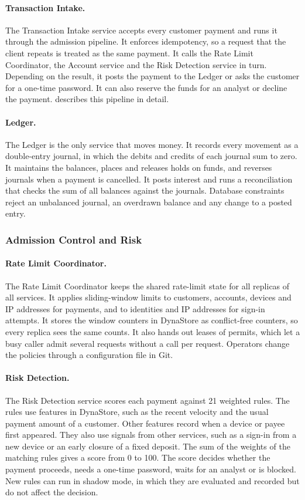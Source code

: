 \documentclass[11pt,a4paper]{article}
\begin{document}
\paragraph{Transaction Intake.} The Transaction Intake service accepts every customer payment and runs it through the admission pipeline. It enforces idempotency, so a request that the client repeats is treated as the same payment. It calls the Rate Limit Coordinator, the Account service and the Risk Detection service in turn. Depending on the result, it posts the payment to the Ledger or asks the customer for a one-time password. It can also reserve the funds for an analyst or decline the payment.  describes this pipeline in detail.

\paragraph{Ledger.} The Ledger is the only service that moves money. It records every movement as a double-entry journal, in which the debits and credits of each journal sum to zero. It maintains the balances, places and releases holds on funds, and reverses journals when a payment is cancelled. It posts interest and runs a reconciliation that checks the sum of all balances against the journals. Database constraints reject an unbalanced journal, an overdrawn balance and any change to a posted entry.

\subsubsection{Admission Control and Risk}

\paragraph{Rate Limit Coordinator.} The Rate Limit Coordinator keeps the shared rate-limit state for all replicas of all services. It applies sliding-window limits to customers, accounts, devices and IP addresses for payments, and to identities and IP addresses for sign-in attempts. It stores the window counters in DynaStore as conflict-free counters, so every replica sees the same counts. It also hands out leases of permits, which let a busy caller admit several requests without a call per request. Operators change the policies through a configuration file in Git.

\paragraph{Risk Detection.} The Risk Detection service scores each payment against 21 weighted rules. The rules use features in DynaStore, such as the recent velocity and the usual payment amount of a customer. Other features record when a device or payee first appeared. They also use signals from other services, such as a sign-in from a new device or an early closure of a fixed deposit. The sum of the weights of the matching rules gives a score from 0 to 100. The score decides whether the payment proceeds, needs a one-time password, waits for an analyst or is blocked. New rules can run in shadow mode, in which they are evaluated and recorded but do not affect the decision.
\end{document}
